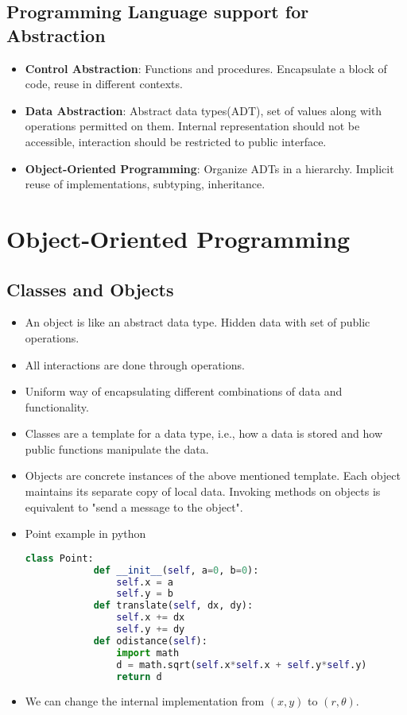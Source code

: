 \documentclass[a4paper]{article}
\begin{document}
\subsection{Programming Language support for Abstraction}
\begin{itemize}
    \item \textbf{Control Abstraction}: Functions and procedures. Encapsulate a block of code, reuse in different contexts.
    \item \textbf{Data Abstraction}: Abstract data types(ADT), set of values along with operations permitted on them. Internal representation should not be accessible, interaction should be restricted to public interface.
    \item \textbf{Object-Oriented Programming}: Organize ADTs in a hierarchy. Implicit reuse of implementations, subtyping, inheritance.
\end{itemize}

\section{Object-Oriented Programming}
\subsection{Classes and Objects}
\begin{itemize}
    \item An object is like an abstract data type. Hidden data with set of public operations.
    \item All interactions are done through operations.
    \item Uniform way of encapsulating different combinations of data and functionality.
    \item Classes are a template for a data type, i.e., how a data is stored and how public functions manipulate the data.
    \item Objects are concrete instances of the above mentioned template. Each object maintains its separate copy of local data. Invoking methods on objects is equivalent to "send a message to the object".
    \item Point example in python
    \begin{lstlisting}[language=Python]
        class Point:
            def __init__(self, a=0, b=0):
                self.x = a
                self.y = b
            def translate(self, dx, dy):
                self.x += dx
                self.y += dy
            def odistance(self):
                import math
                d = math.sqrt(self.x*self.x + self.y*self.y)
                return d
    \end{lstlisting}
    \item We can change the internal implementation from $(x,y)$ to $(r,\theta)$.
\end{itemize}
\end{document}
